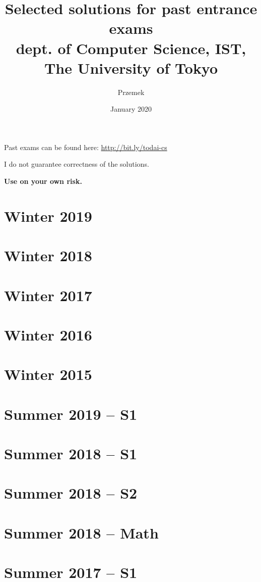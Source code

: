 \documentclass{report}
\title{%
Selected solutions for past entrance exams \\
\large{dept. of Computer Science, IST, \\
The University of Tokyo}}
\author{Przemek}
\date{January 2020}
\begin{document}
\maketitle

\vspace*{\fill}
\begin{center}
Past exams can be found here: \url{http://bit.ly/todai-cs}
\end{center}

\begin{center}
I do not guarantee correctness of the solutions.

\textbf{Use on your own risk.}
\end{center}
\vspace*{\fill}

\tableofcontents

\newpage

\chapter{Winter 2019}


\chapter{Winter 2018}


\chapter{Winter 2017}


\chapter{Winter 2016}


\chapter{Winter 2015}


\chapter{Summer 2019 – S1}


\chapter{Summer 2018 – S1}


\chapter{Summer 2018 – S2}


\chapter{Summer 2018 – Math}


\chapter{Summer 2017 – S1}

\end{document}
